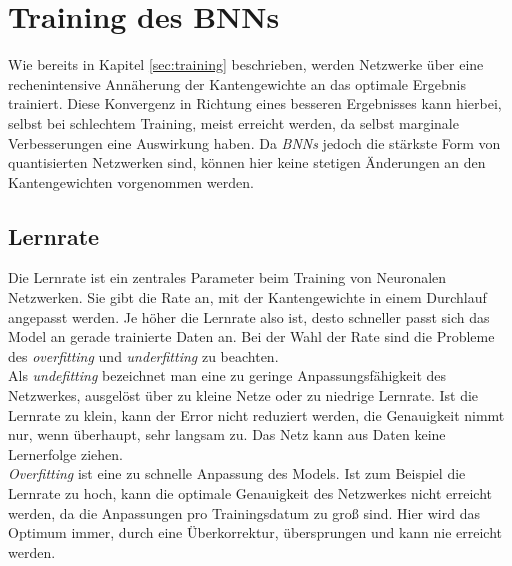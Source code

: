 \chapter{Training des BNNs}
Wie bereits in Kapitel \ref{sec:training} beschrieben, werden Netzwerke über eine rechenintensive Annäherung der Kantengewichte an das optimale Ergebnis trainiert. Diese Konvergenz in Richtung eines besseren Ergebnisses kann hierbei, selbst bei schlechtem Training, meist erreicht werden, da selbst marginale Verbesserungen eine Auswirkung haben. Da \textit{BNNs} jedoch die stärkste Form von quantisierten Netzwerken sind, können hier keine stetigen Änderungen an den Kantengewichten vorgenommen werden.
\section{Lernrate}
Die Lernrate ist ein zentrales Parameter beim Training von Neuronalen Netzwerken. Sie gibt die Rate an, mit der Kantengewichte in einem Durchlauf angepasst werden. Je höher die Lernrate also ist, desto schneller passt sich das Model an gerade trainierte Daten an. Bei der Wahl der Rate sind die Probleme des \textit{overfitting} und \textit{underfitting} zu beachten.\\ 
Als \textit{undefitting} bezeichnet man eine zu geringe Anpassungsfähigkeit des Netzwerkes, ausgelöst über zu kleine Netze oder zu niedrige Lernrate. Ist die Lernrate zu klein, kann der Error nicht reduziert werden, die Genauigkeit nimmt nur, wenn überhaupt, sehr langsam zu. Das Netz kann aus Daten keine Lernerfolge ziehen.\\
\textit{Overfitting} ist eine zu schnelle Anpassung des Models. Ist zum Beispiel die Lernrate zu hoch, kann die optimale Genauigkeit des Netzwerkes nicht erreicht werden, da die Anpassungen pro Trainingsdatum zu groß sind. Hier wird das Optimum immer, durch eine Überkorrektur, übersprungen und kann nie erreicht werden\cite{smith2018}.

